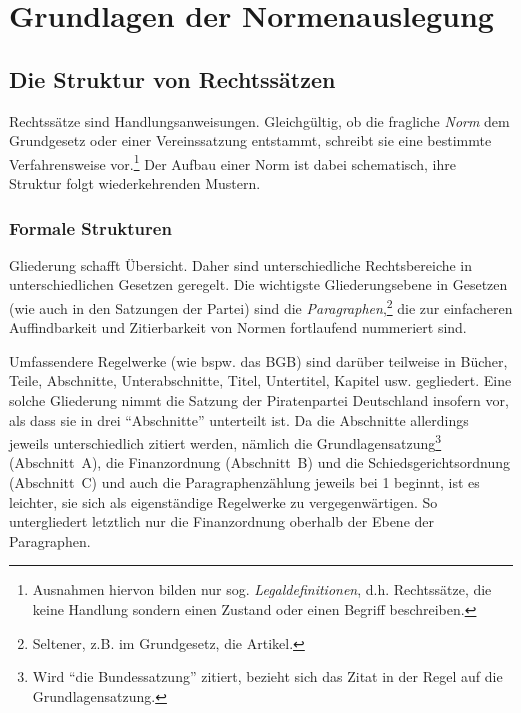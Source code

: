 
\chapter{Grundlagen der Normenauslegung}
\section{Die Struktur von Rechtssätzen}
Rechtssätze sind Handlungsanweisungen. Gleichgültig, ob die fragliche \emph{Norm} dem Grundgesetz oder einer Vereinssatzung entstammt, schreibt sie eine bestimmte Verfahrensweise vor.\footnote{Ausnahmen hiervon bilden nur sog. \emph{Legaldefinitionen}, d.h. Rechtssätze, die keine Handlung sondern einen Zustand oder einen Begriff beschreiben.} Der Aufbau einer Norm ist dabei schematisch, ihre Struktur folgt wiederkehrenden Mustern.

\subsection{Formale Strukturen}
Gliederung schafft Übersicht. Daher sind unterschiedliche Rechtsbereiche in unterschiedlichen Gesetzen geregelt. Die wichtigste Gliederungsebene in Gesetzen (wie auch in den Satzungen der Partei) sind die \emph{Paragraphen},\footnote{Seltener, z.B. im Grundgesetz, die Artikel.} die zur einfacheren Auffindbarkeit und Zitierbarkeit von Normen fortlaufend nummeriert sind.

Umfassendere Regelwerke (wie bspw. das BGB) sind darüber teilweise in Bücher, Teile, Abschnitte, Unterabschnitte, Titel, Untertitel, Kapitel usw. gegliedert. Eine solche Gliederung nimmt die Satzung der Piratenpartei Deutschland insofern vor, als dass sie in drei \enquote{Abschnitte} unterteilt ist. Da die Abschnitte allerdings jeweils unterschiedlich zitiert werden, nämlich die Grundlagensatzung\footnote{Wird \enquote{die Bundessatzung} zitiert, bezieht sich das Zitat in der Regel auf die Grundlagensatzung.} (Abschnitt~A), die Finanzordnung (Abschnitt~B) und die Schiedsgerichtsordnung (Abschnitt~C) und auch die Paragraphenzählung jeweils bei 1 beginnt, ist es leichter, sie sich als eigenständige Regelwerke zu vergegenwärtigen. So untergliedert letztlich nur die Finanzordnung oberhalb der Ebene der Paragraphen.

